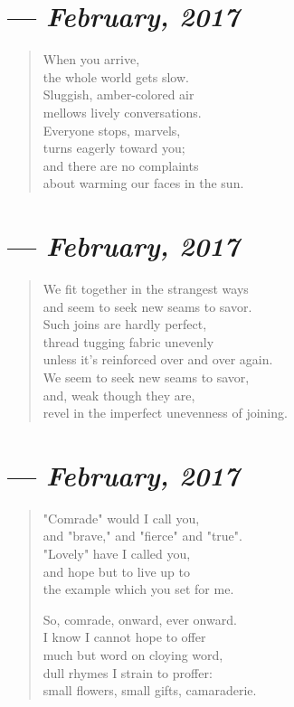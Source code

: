 \section{--- \textit{February, 2017}}

\begin{verse}
When you arrive,\\
the whole world gets slow.\\
Sluggish, amber-colored air\\
mellows lively conversations.\\
Everyone stops, marvels,\\
turns eagerly toward you;\\
and there are no complaints\\
about warming our faces in the sun.
\end{verse}
\newpage

\section{--- \textit{February, 2017}}

\begin{verse}
We fit together in the strangest ways\\
and seem to seek new seams to savor.\\
Such joins are hardly perfect,\\
thread tugging fabric unevenly\\
unless it's reinforced over and over again.\\
We seem to seek new seams to savor,\\
and, weak though they are,\\
revel in the imperfect unevenness of joining.
\end{verse}
\newpage

\section{--- \textit{February, 2017}}

\begin{verse}
"Comrade" would I call you,\\
and "brave," and "fierce" and "true".\\
"Lovely" have I called you,\\
and hope but to live up to\\
the example which you set for me.

So, comrade, onward, ever onward.\\
I know I cannot hope to offer\\
much but word on cloying word,\\
dull rhymes I strain to proffer:\\
small flowers, small gifts, camaraderie.
\end{verse}
\newpage

